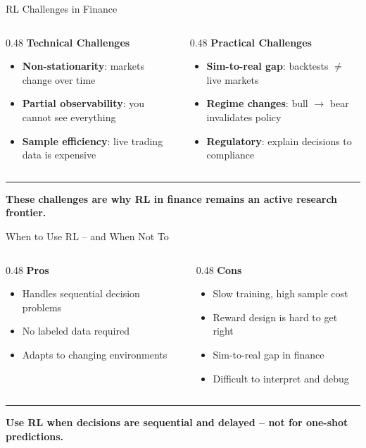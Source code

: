 \documentclass[8pt,aspectratio=169]{beamer}
\newcommand{\bottomnote}[1]{%
\vfill
\vspace{-2mm}
\textcolor{mllavender2}{\rule{\textwidth}{0.4pt}}
\vspace{1mm}
\footnotesize
\textbf{#1}
}
\newenvironment{compactlist}{%
  \begin{itemize}%
    \setlength{\itemsep}{2pt}%
    \setlength{\parskip}{0pt}%
    \setlength{\parsep}{0pt}%
}{%
  \end{itemize}%
}
\begin{document}
\begin{frame}{RL Challenges in Finance}
\begin{columns}[T]
\begin{column}{0.48\textwidth}
\textbf{Technical Challenges}
\begin{compactlist}
  \item \textbf{Non-stationarity}: markets change over time
  \item \textbf{Partial observability}: you cannot see everything
  \item \textbf{Sample efficiency}: live trading data is expensive
\end{compactlist}
\end{column}
\begin{column}{0.48\textwidth}
\textbf{Practical Challenges}
\begin{compactlist}
  \item \textbf{Sim-to-real gap}: backtests $\neq$ live markets
  \item \textbf{Regime changes}: bull $\rightarrow$ bear invalidates policy
  \item \textbf{Regulatory}: explain decisions to compliance
\end{compactlist}
\end{column}
\end{columns}

\bottomnote{These challenges are why RL in finance remains an active research frontier.}
\end{frame}


\begin{frame}{When to Use RL -- and When Not To}
\begin{columns}[T]
\begin{column}{0.48\textwidth}
\textbf{\textcolor{mlgreen}{Pros}}
\begin{compactlist}
  \item Handles sequential decision problems
  \item No labeled data required
  \item Adapts to changing environments
\end{compactlist}
\end{column}
\begin{column}{0.48\textwidth}
\textbf{\textcolor{mlred}{Cons}}
\begin{compactlist}
  \item Slow training, high sample cost
  \item Reward design is hard to get right
  \item Sim-to-real gap in finance
  \item Difficult to interpret and debug
\end{compactlist}
\end{column}
\end{columns}

\bottomnote{Use RL when decisions are sequential and delayed -- not for one-shot predictions.}
\end{frame}
\end{document}
